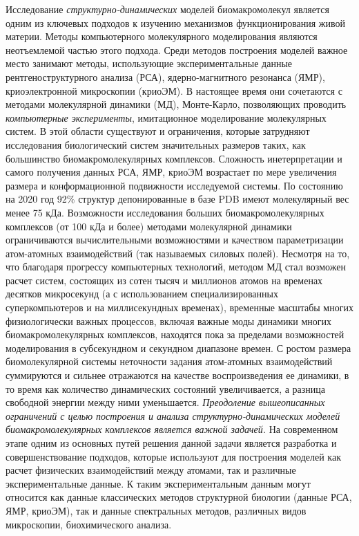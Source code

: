 Исследование \textit{структурно-динамических} моделей биомакромолекул является одним из ключевых подходов к изучению механизмов функционирования живой материи.
Методы компьютерного молекулярного моделирования являются неотъемлемой частью этого подхода. Среди методов построения моделей важное место занимают методы, использующие экспериментальные данные рентгеноструктурного анализа (РСА), ядерно-магнитного резонанса (ЯМР), криоэлектронной микроскопии (криоЭМ). В настоящее время они сочетаются с методами молекулярной динамики (МД), Монте-Карло, позволяющих проводить \textit{компьютерные эксперименты}, имитационное моделирование молекулярных систем. В этой области существуют и ограничения, которые затрудняют исследования биологический систем значительных размеров таких, как большинство биомакромолекулярных комплексов. Сложность инетерпретации и самого получения данных РСА, ЯМР, криоЭМ возрастает по мере увеличения размера и конформационной подвижности исследуемой системы. По состоянию на 2020 год 92\% структур депонированные в базе PDB имеют молекулярный вес менее 75 кДа. Возможности исследования больших биомакромолекулярных комплексов (от 100 кДа и более) методами молекулярной динамики ограничиваются вычислительными возможностями и качеством параметризации атом-атомных взаимодействий (так называемых силовых полей). Несмотря на то, что благодаря прогрессу компьютерных технологий, методом МД стал возможен расчет систем, состоящих из сотен тысяч и миллионов атомов на временах десятков микросекунд (а с использованием специализированных суперкомпьютеров и на миллисекундных временах), временные масштабы многих физиологически важных процессов, включая важные моды динамики многих биомакромолекулярных комплексов, находятся пока за пределами возможностей моделирования в субсекундном и секундном диапазоне времен.  С ростом размера биомолекулярной системы неточности задания атом-атомных взаимодействий суммируются и сильнее отражаются на качестве воспроизведения ее динамики, в то время как количество динамических состояний увеличивается, а разница свободной энергии между ними уменьшается.
\textit{Преодоление вышеописанных ограничений с целью построения и анализа структурно-динамических моделей биомакромолекулярных комплексов является важной задачей.}
На современном этапе одним из основных путей решения данной задачи является разработка и совершенствование подходов, которые используют для построения моделей как расчет физических взаимодействий между атомами, так и различные экспериментальные данные. К таким экспериментальным данным могут относится как данные классических методов структурной биологии (данные РСА, ЯМР, криоЭМ), так и данные спектральных методов, различных видов микроскопии, биохимического анализа. 
